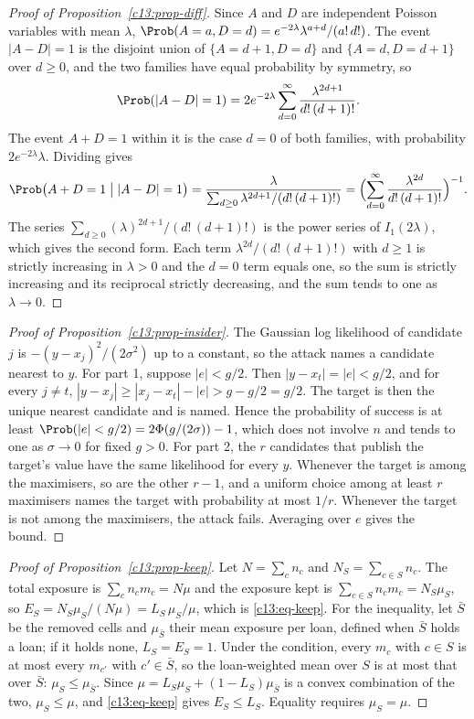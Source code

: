 \begin{proof}[Proof of Proposition~\ref{c13:prop-diff}]
Since $A$ and $D$ are independent Poisson variables with mean $\lambda$,
$\Prob(A=a, D=d) = e^{-2\lambda}\lambda^{a+d}/(a!\,d!)$. The event $|A-D|=1$ is the
disjoint union of $\{A = d+1, D = d\}$ and $\{A = d, D = d+1\}$ over $d \ge 0$, and the
two families have equal probability by symmetry, so
\[
\Prob(|A-D|=1) = 2e^{-2\lambda}\sum_{d=0}^{\infty}\frac{\lambda^{2d+1}}{d!\,(d+1)!}.
\]
The event $A+D=1$ within it is the case $d=0$ of both families, with probability
$2e^{-2\lambda}\lambda$. Dividing gives
\[
\Prob\bigl(A+D=1 \bigm| |A-D|=1\bigr)
= \frac{\lambda}{\sum_{d\ge 0}\lambda^{2d+1}/(d!\,(d+1)!)}
= \Bigl(\sum_{d=0}^{\infty}\frac{\lambda^{2d}}{d!\,(d+1)!}\Bigr)^{-1}.
\]
The series $\sum_{d\ge 0}(\lambda)^{2d+1}/(d!\,(d+1)!)$ is the power series of
$I_1(2\lambda)$, which gives the second form. Each term $\lambda^{2d}/(d!\,(d+1)!)$
with $d \ge 1$ is strictly increasing in $\lambda > 0$ and the $d=0$ term equals one,
so the sum is strictly increasing and its reciprocal strictly decreasing, and the sum
tends to one as $\lambda \to 0$.
\end{proof}

\begin{proof}[Proof of Proposition~\ref{c13:prop-insider}]
The Gaussian log likelihood of candidate $j$ is $-(y-x_j)^2/(2\sigma^2)$ up to a
constant, so the attack names a candidate nearest to $y$. For part 1, suppose
$|e| < g/2$. Then $|y - x_t| = |e| < g/2$, and for every $j \ne t$,
$|y - x_j| \ge |x_j - x_t| - |e| > g - g/2 = g/2$. The target is then the unique
nearest candidate and is named. Hence the probability of success is at least
$\Prob(|e| < g/2) = 2\Phi(g/(2\sigma)) - 1$, which does not involve $n$ and tends to
one as $\sigma \to 0$ for fixed $g > 0$. For part 2, the $r$ candidates that publish
the target's value have the same likelihood for every $y$. Whenever the target is
among the maximisers, so are the other $r-1$, and a uniform choice among at least $r$
maximisers names the target with probability at most $1/r$. Whenever the target is
not among the maximisers, the attack fails. Averaging over $e$ gives the bound.
\end{proof}

\begin{proof}[Proof of Proposition~\ref{c13:prop-keep}]
Let $N = \sum_c n_c$ and $N_S = \sum_{c \in S} n_c$. The total exposure is
$\sum_c n_c m_c = N\mu$ and the exposure kept is $\sum_{c\in S} n_c m_c = N_S \mu_S$, so
$E_S = N_S\mu_S/(N\mu) = L_S\,\mu_S/\mu$, which is \eqref{c13:eq-keep}. For the
inequality, let $\bar S$ be the removed cells and $\mu_{\bar S}$ their mean exposure
per loan, defined when $\bar S$ holds a loan; if it holds none, $L_S = E_S = 1$. Under
the condition, every $m_c$ with $c \in S$ is at most every $m_{c'}$ with
$c' \in \bar S$, so the loan-weighted mean over $S$ is at most that over $\bar S$:
$\mu_S \le \mu_{\bar S}$. Since $\mu = L_S\mu_S + (1-L_S)\mu_{\bar S}$ is a convex
combination of the two, $\mu_S \le \mu$, and \eqref{c13:eq-keep} gives
$E_S \le L_S$. Equality requires $\mu_S = \mu$.
\end{proof}
